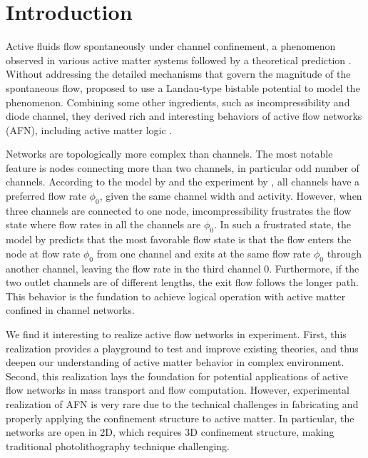 \documentclass[%
10pt,
superscriptaddress,
twocolumn,
 amsmath,amssymb,
 aps,prx,
]{revtex4-2}
\begin{document}
\section{Introduction}

% 

Active fluids flow spontaneously under channel confinement, a phenomenon observed in various active matter systems \cite{Lushi2014,Wioland2016,Wu2017,Duclos2017,Morin2018,Hardouin2020} followed by a theoretical prediction \cite{Voituriez2005}.
Without addressing the detailed mechanisms that govern the magnitude of the spontaneous flow, \citet{Woodhouse2017} proposed to use a Landau-type bistable potential to model the phenomenon. Combining some other ingredients, such as incompressibility and diode channel, they derived rich and interesting behaviors of active flow networks (AFN), including active matter logic \cite{Woodhouse2016,Woodhouse2017}.

Networks are topologically more complex than channels. 
The most notable feature is nodes connecting more than two channels, in particular odd number of channels. 
According to the model by \citet{Woodhouse2017} and the experiment by \citet{Morin2018}, all channels have a preferred flow rate $\phi_0$, given the same channel width and activity.
However, when three channels are connected to one node, imcompressibility frustrates the flow state where flow rates in all the channels are $\phi_0$.
In such a frustrated state, the model by \citet{Woodhouse2017} predicts that the most favorable flow state is that the flow enters the node at flow rate $\phi_0$ from one channel and exits at the same flow rate $\phi_0$ through another channel, leaving the flow rate in the third channel $0$.
Furthermore, if the two outlet channels are of different lengths, the exit flow follows the longer path.  
This behavior is the fundation to achieve logical operation with active matter confined in channel networks. 

We find it interesting to realize active flow networks in experiment. 
First, this realization provides a playground to test and improve existing theories, and thus deepen our understanding of active matter behavior in complex environment. 
Second, this realization lays the foundation for potential applications of active flow networks in mass transport and flow computation. 
However, experimental realization of AFN is very rare due to the technical challenges in fabricating and properly applying the confinement structure to active matter.
In particular, the networks are open in 2D, which requires 3D confinement structure, making traditional photolithography technique challenging.
\end{document}
